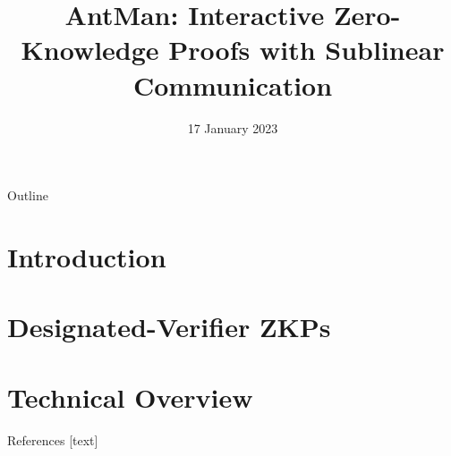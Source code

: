 \documentclass{beamer}
\title{AntMan: Interactive Zero-Knowledge Proofs with Sublinear Communication}
\date{17 January 2023}
\begin{document}
	\begin{frame}
		\titlepage
	\end{frame}
	
	\begin{frame}{Outline}
		\tableofcontents
	\end{frame}
	\section{Introduction}
	
	
	\section{Designated-Verifier ZKPs}
	
	
	\section{Technical Overview}
	
	
	\thankyouframe
	
	\begin{frame}[allowframebreaks]{References}
		
		
		
	\end{frame}
	
\end{document}
